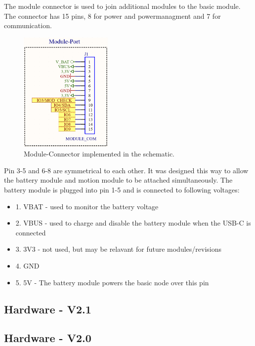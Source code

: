     The module connector is used to join additional modules to the basic module.
    The connector has 15 pins, 8 for power and powermanagment and 7 for 
    communication. 

    \begin{figure}[H]
        \centering
        \includegraphics[width=0.4\textwidth]{assets/HW/Module-Connector-schematic.png}
        \caption{Module-Connector implemented in the schematic.}
    \end{figure}

    Pin 3-5 and 6-8 are symmetrical to each other. It was designed this way
    to allow the battery module and motion module to be attached simultaneously.
    The battery module is plugged into pin 1-5 and is connected to following 
    voltages:
    
    \begin{itemize}
        \item 1. VBAT - used to monitor the battery voltage
        \item 2. VBUS - used to charge and disable the battery module when the USB-C is connected
        \item 3. 3V3 - not used, but may be relavant for future modules/revisions
        \item 4. GND
        \item 5. 5V - The battery module powers the basic node over this pin
    \end{itemize}
     
    

\subsection{Hardware - V2.1}

\subsection{Hardware - V2.0}

        